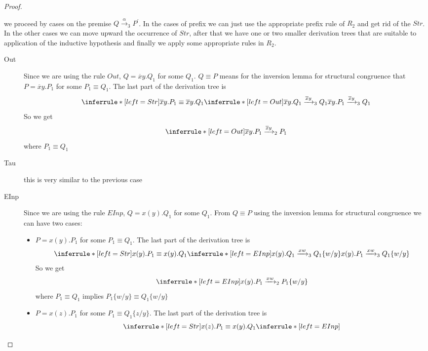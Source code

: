 \begin{theorem}
\begin{proof}
\begin{description}
\begin{itemize}
\[{		  }
		\]
		we proceed by cases on the premise $Q\xrightarrow{\alpha}_{3}P^{'}$. In the cases of prefix we can just use the appropriate prefix rule of $R_{2}$ and get rid of the $Str$. In the other cases we can move upward the occurrence of $Str$, after that we have one or two smaller derivation trees that are suitable to application of the inductive hypothesis and finally we apply some appropriate rules in $R_{2}$.
		\begin{description}
		  \item[Out]
		    Since we are using the rule $Out$, $Q=\overline{x}y.Q_{1}$ for some $Q_{1}$. $Q\equiv P$ means for the inversion lemma for structural congruence that $P=\overline{x}y.P_{1}$ for some $P_{1}\equiv Q_{1}$. The last part of the derivation tree is 
		    \[
		      \inferrule* [left=Str]{
			  \overline{x}y.P_{1}\equiv \overline{x}y.Q_{1}
			\\
			  \inferrule* [left=Out]{
			  }{
			    \overline{x}y.Q_{1}\xrightarrow{\overline{x}y}_{3}Q_{1}
			  }
		      }{
			\overline{x}y.P_{1}\xrightarrow{\overline{x}y}_{3}Q_{1}
		      }
		    \]
		    So we get 
		    \[
		      \inferrule* [left=Out]{
		      }{
			\overline{x}y.P_{1}\xrightarrow{\overline{x}y}_{2}P_{1}
		      }
		    \]
		    where $P_{1}\equiv Q_{1}$
		  \item[Tau] this is very similar to the previous case
		  \item[EInp]
		    Since we are using the rule $EInp$, $Q=x(y).Q_{1}$ for some $Q_{1}$. From $Q\equiv P$ using the inversion lemma for structural congruence we can have two cases:
		    \begin{itemize}
		      \item 
			$P=x(y).P_{1}$ for some $P_{1}\equiv Q_{1}$. The last part of the derivation tree is 
			\[
			  \inferrule* [left=Str]{
			      x(y).P_{1}\equiv x(y).Q_{1}
			    \\
			      \inferrule* [left=EInp]{
			      }{
				x(y).Q_{1}\xrightarrow{xw}_{3}Q_{1}\{w/y\}
			      }
			  }{
			    x(y).P_{1}\xrightarrow{xw}_{3}Q_{1}\{w/y\}
			  }
			\]
			So we get 
			\[
			  \inferrule* [left=EInp]{
			  }{
			    x(y).P_{1}\xrightarrow{xw}_{2}P_{1}\{w/y\}
			  }
			\]
			where $P_{1}\equiv Q_{1}$ implies $P_{1}\{w/y\}\equiv Q_{1}\{w/y\}$
		      \item
			$P=x(z).P_{1}$ for some $P_{1}\equiv Q_{1}\{z/y\}$. The last part of the derivation tree is 
			\[
			  \inferrule* [left=Str]{
			      x(z).P_{1}\equiv x(y).Q_{1}
			    \\
			      \inferrule* [left=EInp]{
}}\]
\end{itemize}
\end{description}
\end{itemize}
\end{description}
\end{proof}
\end{theorem}
